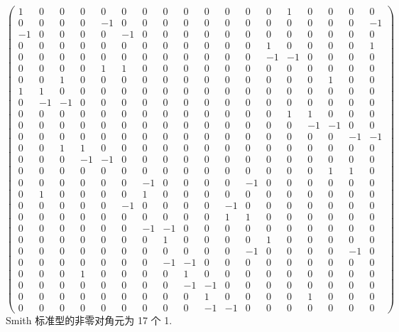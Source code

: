 \documentclass[UTF8]{ctexart}
\begin{document}
\[
\left(\begin{array}{cccccccccccccccccc}
1 & 0 & 0 & 0 & 0 & 0 & 0 & 0 & 0 & 0 & 0 & 0 & 0 & 1 & 0 & 0 & 0 & 0\\
0 & 0 & 0 & 0 & -1 & 0 & 0 & 0 & 0 & 0 & 0 & 0 & 0 & 0 & 0 & 0 & 0 & -1\\
-1 & 0 & 0 & 0 & 0 & -1 & 0 & 0 & 0 & 0 & 0 & 0 & 0 & 0 & 0 & 0 & 0 & 0\\
0 & 0 & 0 & 0 & 0 & 0 & 0 & 0 & 0 & 0 & 0 & 0 & 1 & 0 & 0 & 0 & 0 & 1\\
0 & 0 & 0 & 0 & 0 & 0 & 0 & 0 & 0 & 0 & 0 & 0 & -1 & -1 & 0 & 0 & 0 & 0\\
0 & 0 & 0 & 0 & 1 & 1 & 0 & 0 & 0 & 0 & 0 & 0 & 0 & 0 & 0 & 0 & 0 & 0\\
0 & 0 & 1 & 0 & 0 & 0 & 0 & 0 & 0 & 0 & 0 & 0 & 0 & 0 & 0 & 1 & 0 & 0\\
1 & 1 & 0 & 0 & 0 & 0 & 0 & 0 & 0 & 0 & 0 & 0 & 0 & 0 & 0 & 0 & 0 & 0\\
0 & -1 & -1 & 0 & 0 & 0 & 0 & 0 & 0 & 0 & 0 & 0 & 0 & 0 & 0 & 0 & 0 & 0\\
0 & 0 & 0 & 0 & 0 & 0 & 0 & 0 & 0 & 0 & 0 & 0 & 0 & 1 & 1 & 0 & 0 & 0\\
0 & 0 & 0 & 0 & 0 & 0 & 0 & 0 & 0 & 0 & 0 & 0 & 0 & 0 & -1 & -1 & 0 & 0\\
0 & 0 & 0 & 0 & 0 & 0 & 0 & 0 & 0 & 0 & 0 & 0 & 0 & 0 & 0 & 0 & -1 & -1\\
0 & 0 & 1 & 1 & 0 & 0 & 0 & 0 & 0 & 0 & 0 & 0 & 0 & 0 & 0 & 0 & 0 & 0\\
0 & 0 & 0 & -1 & -1 & 0 & 0 & 0 & 0 & 0 & 0 & 0 & 0 & 0 & 0 & 0 & 0 & 0\\
0 & 0 & 0 & 0 & 0 & 0 & 0 & 0 & 0 & 0 & 0 & 0 & 0 & 0 & 0 & 1 & 1 & 0\\
0 & 0 & 0 & 0 & 0 & 0 & -1 & 0 & 0 & 0 & 0 & -1 & 0 & 0 & 0 & 0 & 0 & 0\\
0 & 1 & 0 & 0 & 0 & 0 & 1 & 0 & 0 & 0 & 0 & 0 & 0 & 0 & 0 & 0 & 0 & 0\\
0 & 0 & 0 & 0 & 0 & -1 & 0 & 0 & 0 & 0 & -1 & 0 & 0 & 0 & 0 & 0 & 0 & 0\\
0 & 0 & 0 & 0 & 0 & 0 & 0 & 0 & 0 & 0 & 1 & 1 & 0 & 0 & 0 & 0 & 0 & 0\\
0 & 0 & 0 & 0 & 0 & 0 & -1 & -1 & 0 & 0 & 0 & 0 & 0 & 0 & 0 & 0 & 0 & 0\\
0 & 0 & 0 & 0 & 0 & 0 & 0 & 1 & 0 & 0 & 0 & 0 & 1 & 0 & 0 & 0 & 0 & 0\\
0 & 0 & 0 & 0 & 0 & 0 & 0 & 0 & 0 & 0 & 0 & -1 & 0 & 0 & 0 & 0 & -1 & 0\\
0 & 0 & 0 & 0 & 0 & 0 & 0 & -1 & -1 & 0 & 0 & 0 & 0 & 0 & 0 & 0 & 0 & 0\\
0 & 0 & 0 & 1 & 0 & 0 & 0 & 0 & 1 & 0 & 0 & 0 & 0 & 0 & 0 & 0 & 0 & 0\\
0 & 0 & 0 & 0 & 0 & 0 & 0 & 0 & -1 & -1 & 0 & 0 & 0 & 0 & 0 & 0 & 0 & 0\\
0 & 0 & 0 & 0 & 0 & 0 & 0 & 0 & 0 & 1 & 0 & 0 & 0 & 0 & 1 & 0 & 0 & 0\\
0 & 0 & 0 & 0 & 0 & 0 & 0 & 0 & 0 & -1 & -1 & 0 & 0 & 0 & 0 & 0 & 0 & 0
\end{array}\right)
\]
Smith 标准型的非零对角元为 17 个 1.
\end{document}
